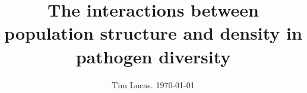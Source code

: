 \documentclass[a4paper,10pt,reqno]{amsart}
\begin{document}
\title{The interactions between population structure and density in pathogen diversity}
\author{Tim Lucas. \today}
\date{}

\maketitle







\small
\printbibliography 
\end{document}
